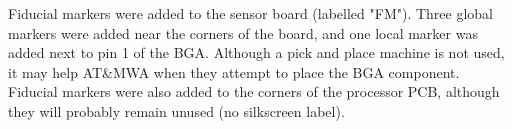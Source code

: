 Fiducial markers were added to the sensor board (labelled "FM"). Three global markers were added near the corners of the board, and one local marker was added next to pin 1 of the BGA.
Although a pick and place machine is not used, it may help AT\&MWA when they attempt to place the BGA component.
\nl
Fiducial markers were also added to the corners of the processor PCB, although they will probably remain unused (no silkscreen label).